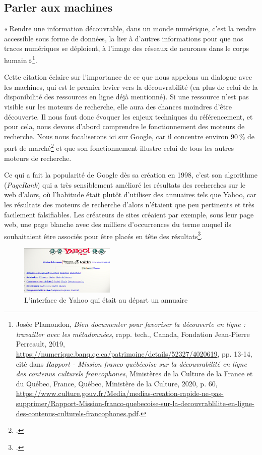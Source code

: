 \subsection*{Parler aux machines}
« Rendre une information découvrable, dans un monde numérique, c’est la rendre accessible sous forme de données, la lier à d’autres informations pour que nos traces numériques se déploient, à l’image des réseaux de neurones dans le corps humain »\footnote{Josée Plamondon, \textit{Bien documenter pour favoriser la découverte en ligne : travailler avec les métadonnées}, rapp. tech., Canada, Fondation Jean-Pierre Perreault, 2019, \url{https://numerique.banq.qc.ca/patrimoine/details/52327/4020619}, pp. 13-14, cité dans \textit{Rapport - Mission franco-québécoise sur la découvrabilité en ligne des contenus culturels francophones}, Ministères de la Culture de la France et du Québec, France, Québec, Ministère de la Culture, 2020, p. 60, \url{https://www.culture.gouv.fr/Media/medias-creation-rapide-ne-pas-supprimer/Rapport-Mission-franco-quebecoise-sur-la-decouvrablilite-en-ligne-des-contenus-culturels-francophones.pdf}.}.

Cette citation éclaire sur l’importance de ce que nous appelons un dialogue avec les machines, qui est le premier levier vers la découvrabilité (en plus de celui de la disponibilité des ressources en ligne déjà mentionné). Si une ressource n’est pas visible sur les moteurs de recherche, elle aura des chances moindres d’être découverte. Il nous faut donc évoquer les enjeux techniques du référencement, et pour cela, nous devons d’abord comprendre le fonctionnement des moteurs de recherche. Nous nous focaliserons ici sur Google, car il concentre environ 90 \% de part de marché\footcite{zotero-245} et que son fonctionnement illustre celui de tous les autres moteurs de recherche. 

Ce qui a fait la popularité de Google dès sa création en 1998, c’est son algorithme (\textit{PageRank}) qui a très sensiblement amélioré les résultats des recherches sur le web d’alors, où l’habitude était plutôt d’utiliser des annuaires tels que Yahoo, car les résultats des moteurs de recherche d’alors n’étaient que peu pertinents et très facilement falsifiables. Les créateurs de sites créaient par exemple, sous leur page web, une page blanche avec des milliers d’occurrences du terme auquel ils souhaitaient être associés pour être placés en tête des résultats\footcite[§ 4]{cardon2013}.


\begin{figure}[h!]
	\centering
	\includegraphics[width=0.4\textwidth]{images/image2.jpg}
	\caption{L'interface de Yahoo qui était au départ un annuaire }
	\label{fig:image2}
\end{figure}


